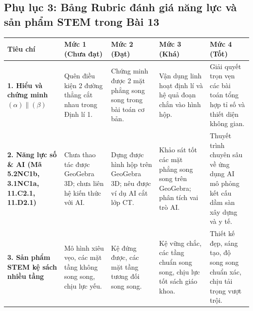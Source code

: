 \documentclass[12pt, a4paper]{article}
\begin{document}
\subsection*{Phụ lục 3: Bảng Rubric đánh giá năng lực và sản phẩm STEM trong Bài 13}

\begin{center}
\begin{tabularx}{\linewidth}{|p{3.0cm}|X|X|X|X|}
\hline
\textbf{Tiêu chí} & \textbf{Mức 1 (Chưa đạt)} & \textbf{Mức 2 (Đạt)} & \textbf{Mức 3 (Khá)} & \textbf{Mức 4 (Tốt)} \\
\hline
\textbf{1. Hiểu và chứng minh $(\alpha) \parallel (\beta)$} & Quên điều kiện 2 đường thẳng cắt nhau trong Định lí 1. & Chứng minh được 2 mặt phẳng song song trong bài toán cơ bản. & Vận dụng linh hoạt định lí và hệ quả đoạn chắn vào hình hộp. & Giải quyết trọn vẹn các bài toán tổng hợp tỉ số và thiết diện không gian. \\
\hline
\textbf{2. Năng lực số \& AI (Mã 5.2NC1b, 3.1NC1a, 11.C2.1, 11.D2.1)} & Chưa thao tác được GeoGebra 3D; chưa liên hệ kiến thức với AI. & Dựng được hình hộp trên GeoGebra 3D; nêu được ví dụ AI cắt lớp CT. & Khảo sát tốt các mặt phẳng song song trên GeoGebra; phân tích vai trò AI. & Thuyết trình chuyên sâu về ứng dụng AI mô phỏng kết cấu dầm sàn xây dựng và y tế. \\
\hline
\textbf{3. Sản phẩm STEM kệ sách nhiều tầng} & Mô hình xiêu vẹo, các mặt tầng không song song, chịu lực yếu. & Kệ đứng được, các mặt tầng tương đối song song. & Kệ vững chắc, các tầng chuẩn song song, chịu lực tốt sách giáo khoa. & Thiết kế đẹp, sáng tạo, độ song song chuẩn xác, chịu tải trọng vượt trội. \\
\hline
\end{tabularx}
\end{center}
\end{document}

